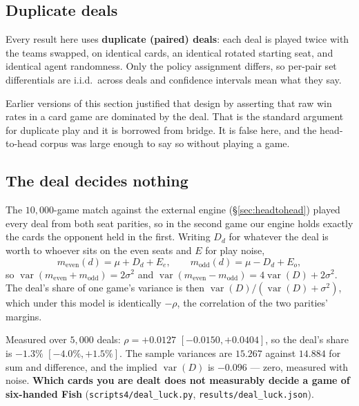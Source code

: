 \documentclass[11pt,letterpaper]{article}
\begin{document}
\subsection{Duplicate deals}

Every result here uses \textbf{duplicate (paired) deals}: each deal is played
twice with the teams swapped, on identical cards, an identical rotated starting
seat, and identical agent randomness. Only the policy assignment differs, so
per-pair set differentials are i.i.d.\ across deals and confidence intervals
mean what they say.

Earlier versions of this section justified that design by asserting that raw
win rates in a card game are dominated by the deal. That is the standard
argument for duplicate play and it is borrowed from bridge. It is false here,
and the head-to-head corpus was large enough to say so without playing a game.

\subsection{The deal decides nothing}
\label{sec:dealluck}

The $10{,}000$-game match against the external engine (\S\ref{sec:headtohead}) played every deal
from both seat parities, so in the second game our engine holds exactly the
cards the opponent held in the first. Writing $D_d$ for whatever the deal is
worth to whoever sits on the even seats and $E$ for play noise,
%
\begin{equation}
m_{\text{even}}(d) = \mu + D_d + E_e,
\qquad
m_{\text{odd}}(d) = \mu - D_d + E_o ,
\end{equation}
%
so $\operatorname{var}(m_{\text{even}} + m_{\text{odd}}) = 2\sigma^2$ and
$\operatorname{var}(m_{\text{even}} - m_{\text{odd}}) = 4\operatorname{var}(D)
+ 2\sigma^2$. The deal's share of one game's variance is then
$\operatorname{var}(D)/(\operatorname{var}(D)+\sigma^2)$, which under this model
is identically $-\rho$, the correlation of the two parities' margins.

Measured over $5{,}000$ deals: $\rho = +0.0127$ $[-0.0150, +0.0404]$, so the
deal's share is $-1.3\%$ $[-4.0\%, +1.5\%]$. The sample variances are
$15.267$ against $14.884$ for sum and difference, and the implied
$\operatorname{var}(D)$ is $-0.096$ --- zero, measured with noise.
\textbf{Which cards you are dealt does not measurably decide a game of
six-handed Fish} (\texttt{scripts4/deal\_luck.py},
\texttt{results/deal\_luck.json}).
\end{document}
